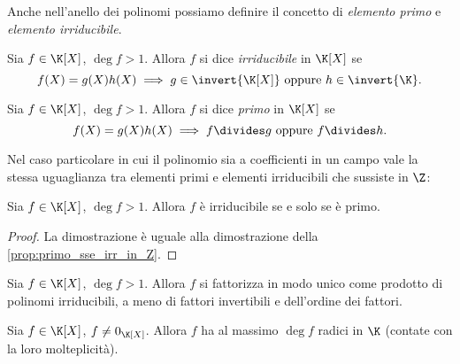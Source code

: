 Anche nell'anello dei polinomi possiamo definire il concetto di \emph{elemento primo} e \emph{elemento irriducibile}.

\begin{definition}
    Sia $f \in \K[X]$, $\deg f > 1$. Allora $f$ si dice \emph{irriducibile} in $\K[X]$ se \[
        f(X) = g(X)h(X) \implies g \in \invert{\K[X]} \text{ oppure } h \in \invert{\K}.
    \]
\end{definition}

\begin{definition}
    Sia $f \in \K[X]$, $\deg f > 1$. Allora $f$ si dice \emph{primo} in $\K[X]$ se \[
        f(X) = g(X)h(X) \implies f \divides g \text{ oppure } f \divides h.
    \]
\end{definition}

Nel caso particolare in cui il polinomio sia a coefficienti in un campo vale la stessa uguaglianza tra elementi primi e elementi irriducibili che sussiste in $\Z$:

\begin{proposition}
    Sia $f \in \K[X]$, $\deg f > 1$. Allora $f$ è irriducibile se e solo se è primo.
\end{proposition}
\begin{proof}
    La dimostrazione è uguale alla dimostrazione della \autoref{prop:primo_sse_irr_in_Z}.
\end{proof}

\begin{theorem}
    \label{th:fatt_unica}
    Sia $f \in \K[X]$, $\deg f > 1$. Allora $f$ si fattorizza in modo unico come prodotto di polinomi irriducibili, a meno di fattori invertibili e dell'ordine dei fattori.
\end{theorem}

\begin{corollary}
    Sia $f \in \K[X]$, $f \neq 0_{\K[X]}$. Allora $f$ ha al massimo $\deg f$ radici in $\K$ (contate con la loro molteplicità).
\end{corollary}